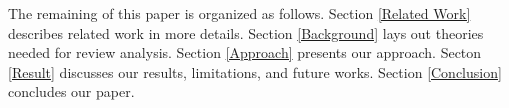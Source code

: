 
The remaining of this paper is organized as follows. Section \ref{Related Work} describes related work in more details. Section \ref{Background} lays out theories needed for review analysis. Section \ref{Approach} presents our approach. Secton \ref{Result} discusses our results, limitations, and future works. Section \ref{Conclusion} concludes our paper. 
